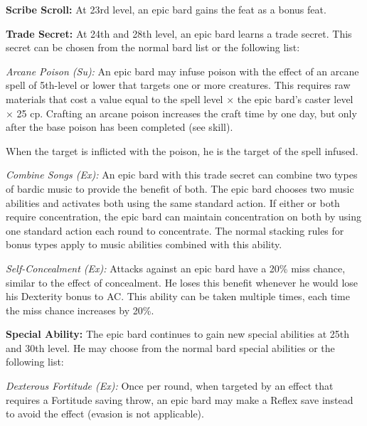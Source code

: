 \textbf{Scribe Scroll:} At 23rd level, an epic bard gains the  feat as a bonus feat.

\textbf{Trade Secret:} At 24th and 28th level, an epic bard learns a trade secret. This secret can be chosen from the normal bard list or the following list:

\textit{Arcane Poison (Su):} An epic bard may infuse poison with the effect of an arcane spell of 5th-level or lower that targets one or more creatures. This requires raw materials that cost a value equal to the spell level $\times$ the epic bard's caster level $\times$ 25 cp. Crafting an arcane poison increases the craft time by one day, but only after the base poison has been completed (see  skill).

When the target is inflicted with the poison, he is the target of the spell infused.

\textit{Combine Songs (Ex):} An epic bard with this trade secret can combine two types of bardic music to provide the benefit of both. The epic bard chooses two music abilities and activates both using the same standard action. If either or both require concentration, the epic bard can maintain concentration on both by using one standard action each round to concentrate. The normal stacking rules for bonus types apply to music abilities combined with this ability.


\textit{Self-Concealment (Ex):} Attacks against an epic bard have a 20\% miss chance, similar to the effect of concealment. He loses this benefit whenever he would lose his Dexterity bonus to AC. This ability can be taken multiple times, each time the miss chance increases by 20\%.


\textbf{Special Ability:} The epic bard continues to gain new special abilities at 25th and 30th level. He may choose from the normal bard special abilities or the following list:

\textit{Dexterous Fortitude (Ex):} Once per round, when targeted by an effect that requires a Fortitude saving throw, an epic bard may make a Reflex save instead to avoid the effect (evasion is not applicable).

